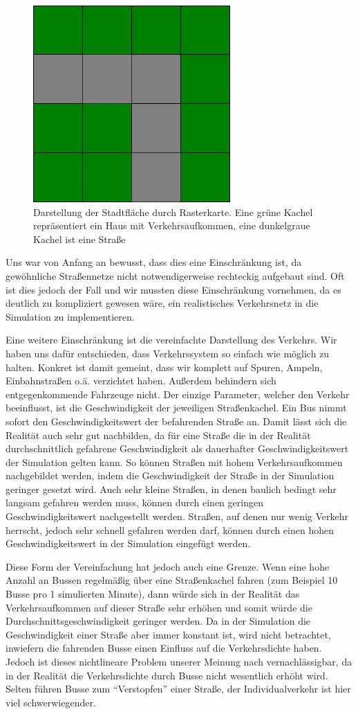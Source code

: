 \documentclass[a4paper, 11pt]{scrartcl}
\begin{document}
\begin{figure}[H]
    \centering
    \includegraphics[width=0.4\linewidth]{images/tilestreet.jpg}
    \caption{Darstellung der Stadtfläche durch Rasterkarte. Eine grüne Kachel repräsentiert ein Haus mit Verkehrsaufkommen, eine dunkelgraue Kachel ist eine Straße}
    \label{fig:tileexample}
\end{figure}

Uns war von Anfang an bewusst, dass dies eine Einschränkung ist, da gewöhnliche Straßennetze nicht notwendigerweise rechteckig aufgebaut sind. Oft ist dies jedoch der Fall und wir mussten diese Einschränkung vornehmen, da es deutlich zu kompliziert gewesen wäre, ein realistisches Verkehrsnetz in die Simulation zu implementieren.

Eine weitere Einschränkung ist die vereinfachte Darstellung des Verkehrs. Wir haben uns dafür entschieden, dass Verkehrssystem so einfach wie möglich zu halten. Konkret ist damit gemeint, dass wir komplett auf Spuren, Ampeln, Einbahnstraßen o.ä. verzichtet haben. Außerdem behindern sich entgegenkommende Fahrzeuge nicht.
Der einzige Parameter, welcher den Verkehr beeinflusst, ist die Geschwindigkeit der jeweiligen Straßenkachel. Ein Bus nimmt sofort den Geschwindigkeitswert der befahrenden Straße an. Damit lässt sich die Realität auch sehr gut nachbilden, da für eine Straße die in der Realität durchschnittlich gefahrene Geschwindigkeit als dauerhafter Geschwindigkeitswert der Simulation gelten kann. So können Straßen mit hohem Verkehrsaufkommen nachgebildet werden, indem die Geschwindigkeit der Straße in der Simulation geringer gesetzt wird. Auch sehr kleine Straßen, in denen baulich bedingt sehr langsam gefahren werden muss, können durch einen geringen Geschwindigkeitswert nachgestellt werden. Straßen, auf denen nur wenig Verkehr herrscht, jedoch sehr schnell gefahren werden darf, können durch einen hohen Geschwindigkeitswert in der Simulation eingefügt werden.

Diese Form der Vereinfachung hat jedoch auch eine Grenze. Wenn eine hohe Anzahl an Bussen regelmäßig über eine Straßenkachel fahren (zum Beispiel 10 Busse pro 1 simulierten Minute), dann würde sich in der Realität das Verkehrsaufkommen auf dieser Straße sehr erhöhen und somit würde die Durchschnittsgeschwindigkeit geringer werden. Da in der Simulation die Geschwindigkeit einer Straße aber immer konstant ist, wird nicht betrachtet, inwiefern die fahrenden Busse einen Einfluss auf die Verkehrsdichte haben.
Jedoch ist dieses nichtlineare Problem unserer Meinung nach vernachlässigbar, da in der Realität die Verkehrsdichte durch Busse nicht wesentlich erhöht wird. Selten führen Busse zum "`Verstopfen"' einer Straße, der Individualverkehr ist hier viel schwerwiegender.
\end{document}
